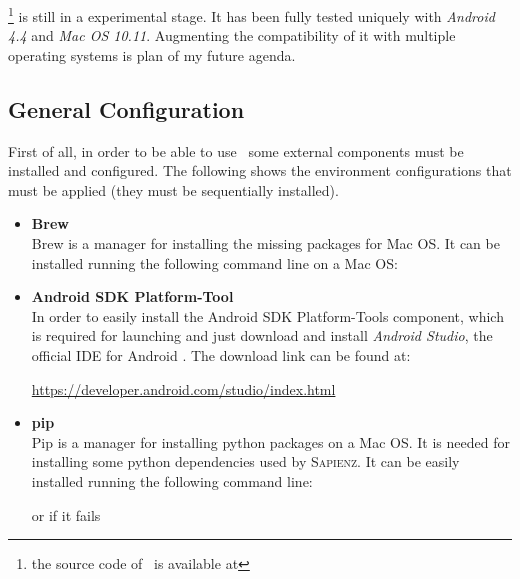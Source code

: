 \toolname\footnote{the source code of \toolname\ is available at \toolurl } is still in a experimental stage. It has been fully tested uniquely with \textit{Android 4.4} and \textit{Mac OS 10.11}. 
Augmenting the compatibility of it with multiple operating systems is plan of my future agenda. 

\subsection{General Configuration}
First of all, in order to be able to use \toolname\ some external components must be installed and configured. 
The following shows the environment configurations that must be applied (they must be sequentially installed).
\begin{itemize}
\item \textbf{Brew} \\
Brew \cite{brew} is a manager for installing the missing packages for Mac OS. 
It can be installed running the following command line on a Mac OS: 
{\scriptsize
\begin{center}
\end{center}
}%
\item \textbf{Android SDK Platform-Tool}\\
In order to easily install the Android SDK Platform-Tools component, which is required for launching \sapienz and \monkey just download and install \textit{Android Studio}, the official IDE for Android \cite{androidstudio}. 
The download link can be found at:  
\begin{center}
\url{https://developer.android.com/studio/index.html}
\end{center}
\item \textbf{pip} \\
Pip is a manager for installing python packages on a Mac OS. It is needed for installing some python dependencies used by \textsc{Sapienz}.  
It can be easily installed running the following command line: 	
\begin{center}
\end{center}
\begin{center}
or if it fails
\end{center}
\begin{center}
\end{center}

\end{itemize}

